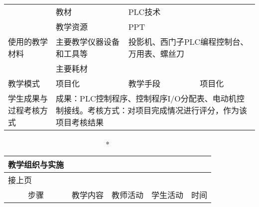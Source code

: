 {\begin{longtable}{|m{20mm}|m{20mm}|m{20mm}|m{20mm}|m{20mm}|m{28mm}|}
\hline
 &教材 & \multicolumn{4}{l|}{PLC技术}\\
\cline{2-6}& 教学资源 &\multicolumn{4}{m{88mm}|}{PPT}\\
\cline{2-6}\centering 使用的教学材料& 主要教学仪器设备和工具等 &\multicolumn{4}{m{88mm}|}{投影机、西门子PLC编程控制台、万用表、螺丝刀}\\
\cline{2-6}& 主要耗材 &\multicolumn{4}{m{88mm}|}{\qquad}\\
\hline
\centering 教学模式 &\multicolumn{2}{l|}{项目化}&\centering 教学手段 &\multicolumn{2}{l|}{项目化}\\
\hline
\centering 学生成果与过程考核方式 &\multicolumn{5}{m{108mm}|}{成果：PLC控制程序、控制程序I/O分配表、电动机控制接线。考核方式：对项目完成情况进行评分，作为该项目考核结果}
\end{longtable}
\clearpage


\begin{landscape}
\begin{longtable}{|m{10mm}|m{50mm}|m{50mm}|m{50mm}|m{15mm}|}
\caption*{\huge 教学组织与实施}\\
\hline
\endfirsthead
\multicolumn{5}{l}{\small 接上页}\\
\hline
\multicolumn{1}{|c|}{步骤}&\multicolumn{1}{c|}{教学内容}&\multicolumn{1}{c|}{教师活动}&\multicolumn{1}{c|}{学生活动}&\multicolumn{1}{c|}{时间}\\
\hline
\endhead


\end{longtable}
\end{landscape}}
